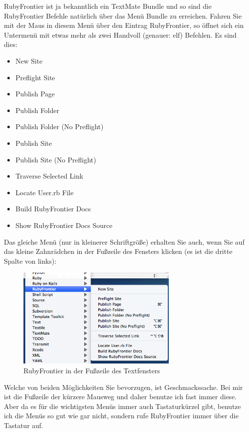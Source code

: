 \documentclass[11pt]{report}
\begin{document}
RubyFrontier ist ja bekanntlich ein TextMate Bundle und so sind die
RubyFrontier Befehle natürlich über das Menü Bundle zu
erreichen. Fahren Sie mit der Maus in diesem Menü über den Eintrag
RubyFrontier, so öffnet sich ein Untermenü mit etwas mehr als zwei
Handvoll (genauer: elf) Befehlen. Es sind dies:

\begin{itemize}
\item New Site
\item Preflight Site
\item Publish Page
\item Publish Folder
\item Publish Folder (No Preflight)
\item Publish Site
\item Publish Site (No Preflight)
\item Traverse Selected Link
\item Locate User.rb File
\item Build RubyFrontier Docs
\item Show RubyFrontier Docs Source
\end{itemize}

Das gleiche Menü (nur in kleinerer Schriftgröße) erhalten Sie auch,
wenn Sie auf das kleine Zahnrädchen in der Fußzeile des Fensters
klicken (es ist die dritte Spalte von links):

\begin{figure}[h!]
\centering
\includegraphics[width=0.7\textwidth]{./images/rubyfrontier-in-textmate-fusszeile.png}
\caption{\label{rubyfrontier-in-textmate-fusszeile}RubyFrontier in der Fußzeile des Textfensters}
\end{figure}

Welche von beiden Möglichkeiten Sie bevorzugen, ist
Geschmackssache. Bei mir ist die Fußzeile der kürzere Mausweg und
daher benutze ich fast immer diese. Aber da es für die wichtigsten
Menüs immer auch Tastaturkürzel gibt, benutze ich die Menüs so gut wie
gar nicht, sondern rufe RubyFrontier immer über die Tastatur auf.
\end{document}
